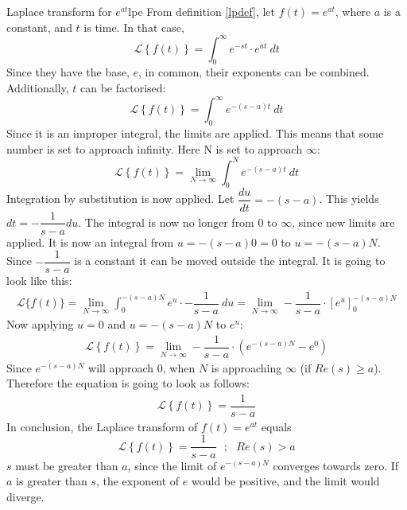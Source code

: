 \begin{example}{Laplace transform for $e^{at}$}{lpe}
From definition \ref{lpdef}, let $f(t)=e^{at}$, where $a$ is a constant, and $t$ is time. In that case,
$$\mathcal{L} \left\{f(t) \right\}=\int_{0}^{\infty} e^{-st}\cdot e^{at}\ dt$$
Since they have the base, $e$, in common, their exponents can be combined. Additionally, $t$ can be factorised:
$$\mathcal{L} \left\{f(t) \right\}=\int_{0}^{\infty} e^{-(s-a)t}\ dt$$
Since it is an improper integral, the limits are applied. This means that some number is set to approach infinity. Here N is set to approach $\infty$:
$$\mathcal{L} \left\{f(t) \right\}=\lim_{N \to \infty} \int_{0}^{N} e^{-(s-a)t}\ dt$$
Integration by substitution is now applied. Let $\dfrac{du}{dt}=-(s-a)$. This yields $dt=-\dfrac{1}{s-a}du$. The integral is now no longer from 0 to $\infty$, since new limits are applied. It is now an integral from $u=-(s-a)0=0$ to $u=-(s-a)N$. Since $-\dfrac{1}{s-a}$ is a constant it can be moved outside the integral. It is going to look like this:
\begin{align}
\mathcal{L}\{f(t)\}=\lim_{N \to \infty} \int_{0}^{-(s-a)N} e^{u}\cdot -\dfrac{1}{s-a}\ du = \lim_{N \to \infty} -\dfrac{1}{s-a} \cdot \left[e^{u} \right]_{0}^{-(s-a)N}
\label{eq6.2}
\end{align}
Now applying $u=0$ and $u=-(s-a)N$ to $e^{u}$:
\begin{align*}
\mathcal{L} \left\{f(t) \right\} =\lim_{N \to \infty} -\dfrac{1}{s-a}\cdot (e^{-(s-a)N}-e^{0})
\end{align*}
Since $e^{-(s-a)N}$ will approach $0$, when $N$ is approaching $\infty$ (if $Re(s) \geq a$). Therefore the equation is going to look as follows:
\begin{align}
\mathcal{L} \left\{f(t) \right\} = \dfrac{1}{s-a}
\end{align}
In conclusion, the Laplace transform of $f(t)=e^{at}$ equals
$$\mathcal{L} \left\{f(t) \right\} =\dfrac{1}{s-a} \ \ \ ;\ \ \ Re(s)>a$$
$s$ must be greater than $a$, since the limit of $e^{-(s-a)N}$ converges towards zero. If $a$ is greater than $s$, the exponent of $e$ would be positive, and the limit would diverge.
\end{example}

